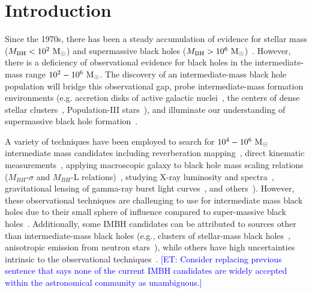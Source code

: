 \documentclass[%
 nofootinbib,
 amsmath,amssymb,
 aps,
 twocolumn,
 superscriptaddress
]{revtex4-2}
\newcommand{\mathcmd}[1]{{\sc \relax\ifmmode#1\else $#1$\fi}\xspace}
\newcommand{\msun}{\mathcmd{\text{M}_\odot}}
\newcommand{\et}[1]{\textcolor{blue}{[ET: #1]}}
\begin{document}
\section{Introduction}
Since the 1970s, there has been a steady accumulation of evidence for stellar mass ($M_\text{BH} < 10^{2} \ \msun$) and supermassive black holes ($M_\text{BH} > 10^{6} \ \msun$)~\cite{Webster:1972:Natur, Balick:1974:ApJ, Ghez:1998:ApJ, Genzel:2010:RvMP, Abbott:2019:PhRvX, EventHorizonTelescopeCollaboration:2019:ApJL, Abbott:2020:arXiv}.  However, there is a deficiency of observational evidence for black holes in the intermediate-mass range $10^{2} - 10^{6}\ \msun$. The discovery of an intermediate-mass black hole population will bridge this observational gap, probe intermediate-mass formation environments (e.g. accretion disks of active galactic nuclei~\cite{Tagawa:2021:ApJ, Li:2021:arXiv, Samsing:2020:arXiv, Tagawa:2020:ApJ, Ishibashi:2020:A&A, Grobner:2020:A&A, Yang:2019:PhRvL, McKernan:2019:ApJL, Yang:2019:ApJ, McKernan:2018:ApJ, Bellovary:2016:ApJL, McKernan:2014:MNRAS, McKernan:2012:MNRAS}, the centers of dense stellar clusters~\cite{Banerjee:2021:MNRASa, Zevin:2021:ApJ,Mapelli:2021:arXiv,Weatherford:2021:ApJL, Bouffanais:2021:arXiv, Ballone:2021:MNRAS, Kumamoto:2021:arXiv, Banerjee:2021:MNRASb, Martinez:2020:ApJ, Romero-Shaw:2020:ApJL, Anagnostou:2020:PASA}, Population-III stars~\cite{Toubiana:2021:PhRvL, Farrell:2021:MNRAS, Safarzadeh:2020:ApJL, Liu:2020:MNRAS, Inayoshi:2017:MNRAS}), and illuminate our understanding of supermassive black hole formation~\cite{Askar:2021:MNRAS, ArcaSedda:2019:arXiv, Amaro-Seoane:2007:CQGra, Gurkan:2006:ApJL}. 

A variety of techniques have been employed to search for $10^{4} - 10^{6}\ \msun$ intermediate mass candidates including reverberation mapping~\cite{Peterson:2014:SSRv}, direct kinematic measurements~\cite{Schodel:2002:Natur, Kiziltan:2017:Natur}, applying macroscopic galaxy to black hole mass scaling relations ($M_{BH}$-$\sigma$ and $M_{BH}$-L relations)~\cite{Graham:2013:ApJ, Wevers:2017:MNRAS}, studying  X-ray luminosity and spectra~\cite{Greene:2004:ApJ, Lin:2020:ApJL}, gravitational lensing of gamma-ray burst light curves~\cite{paynter_evidence_2021}, and others~\cite{Greene:2020:ARA&A, Koliopanos:2017:mbhe, Mezcua:2017:IJMPD}). However, these observational techniques are challenging to use for intermediate mass black holes due to their small sphere of influence compared to super-massive black holes~\cite{Mezcua:2017:IJMPD}. Additionally, some IMBH candidates can be attributed to sources other than intermediate-mass black holes (e.g., clusters of stellar-mass black holes~\cite{Ridolfi:2016:MNRAS, Freire:2017:MNRAS}, anisotropic emission from neutron stars~\cite{Israel:2017:MNRAS, RodriguezCastillo:2020:ApJ}), while others have high uncertainties intrinsic to the observational techniques~\cite{Greene:2020:ARA&A}. 
\et{Consider replacing previous sentence that says none of the current IMBH candidates are widely accepted within the astronomical community as unambiguous.}
\end{document}
